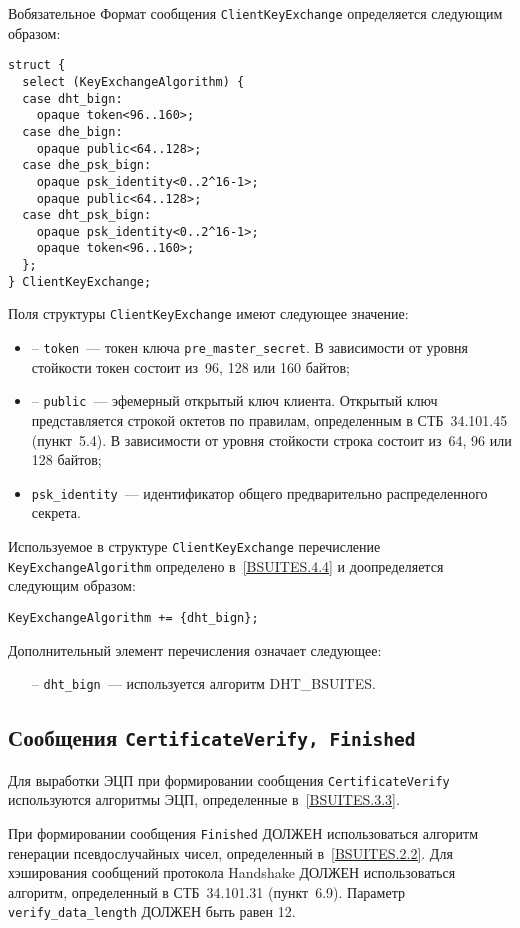 \begin{appendix}{В}{обязательное}
Формат сообщения \lstinline{ClientKeyExchange} определяется следующим образом:
\begin{lstlisting}
struct {
  select (KeyExchangeAlgorithm) {
  case dht_bign:
    opaque token<96..160>;
  case dhe_bign:
    opaque public<64..128>;
  case dhe_psk_bign:
    opaque psk_identity<0..2^16-1>;
    opaque public<64..128>;
  case dht_psk_bign:
    opaque psk_identity<0..2^16-1>;
	opaque token<96..160>;
  };
} ClientKeyExchange;
\end{lstlisting}

Поля структуры \lstinline{ClientKeyExchange} имеют следующее значение:
\begin{itemize}
\item [--]
\lstinline{token}~--- токен ключа \lstinline{pre_master_secret}. 
В зависимости от уровня стойкости токен состоит из~96, 128 или 160 байтов; 

\item[--]
\lstinline{public}~--- эфемерный открытый ключ клиента. Открытый 
ключ представляется строкой октетов по правилам, определенным в СТБ~34.101.45 
(пункт~5.4). В зависимости от уровня стойкости строка состоит из~64, 96 
или 128 байтов;  

\item[--]
\lstinline{psk_identity}~--- идентификатор общего предварительно 
распределенного секрета. 
\end{itemize}

Используемое в структуре \lstinline{ClientKeyExchange} перечисление 
\lstinline{KeyExchangeAlgorithm} определено в~\ref{BSUITES.4.4} и доопределяется 
следующим образом: 
\begin{lstlisting}
KeyExchangeAlgorithm += {dht_bign};
\end{lstlisting}

Дополнительный элемент перечисления означает следующее:
\begin{itemize}
\item[--]
\lstinline{dht_bign}~--- используется алгоритм DHT\_BSUITES.
\end{itemize}

\subsection{Сообщения \lstinline{CertificateVerify, Finished}}\label{BSUITES.4.9}

Для выработки ЭЦП при формировании сообщения \lstinline{CertificateVerify} 
используются алгоритмы ЭЦП, определенные в~\ref{BSUITES.3.3}.  

При формировании сообщения \lstinline{Finished} ДОЛЖЕН использоваться алгоритм 
генерации псевдослучайных чисел, определенный в~\ref{BSUITES.2.2}. Для хэширования 
сообщений протокола Handshake ДОЛЖЕН использоваться алгоритм, 
определенный в СТБ~34.101.31 (пункт~6.9). Параметр 
\lstinline{verify_data_length} ДОЛЖЕН быть равен 12. 

\end{appendix}
